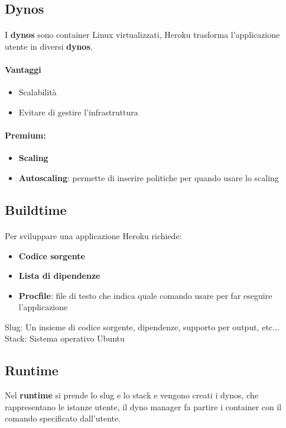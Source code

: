 \documentclass[a4paper, 12pt]{report}
\begin{document}
      \subsection{Dynos}
      \paragraph{}I \textbf{dynos} sono container Linux virtualizzati, Heroku trasforma l'applicazione utente in diversi \textbf{dynos}.
      \paragraph{Vantaggi}
      \begin{itemize}
        \item Scalabilità 
        \item Evitare di gestire l'infrastruttura
      \end{itemize}
      \paragraph{Premium:}
      \begin{itemize}
        \item \textbf{Scaling}
        \item \textbf{Autoscaling}: permette di inserire politiche per quando usare lo scaling
      \end{itemize}
      \subsection{Buildtime}
      \paragraph{}Per sviluppare una applicazione Heroku richiede:
      \begin{itemize}
        \item \textbf{Codice sorgente}
        \item \textbf{Lista di dipendenze}
        \item \textbf{Procfile}: file di testo che indica quale comando usare per far eseguire l'applicazione
      \end{itemize}
      Slug: Un insieme di codice sorgente, dipendenze, supporto per output, etc...
      Stack: Sistema operativo Ubuntu
      \subsection{Runtime}
      Nel \textbf{runtime} si prende lo slug e lo stack e vengono creati i dynos, che rappresentano le istanze utente, il dyno manager fa partire i container con il comando specificato dall'utente.
\end{document}
